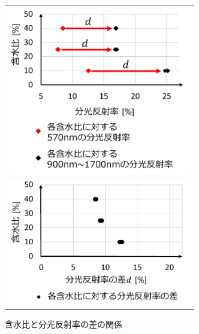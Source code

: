 \begin{figure}[p]
	\begin{center}
		\begin{tabular}{c}

			\begin{minipage}[t]{\linewidth}
			\hspace{1.5cm}\includegraphics[width=8cm]{./Ch4_WaterContentEstimation/Fig/watercontent_and_spectrum_graph_compressed.pdf}
			\caption{含水比と2つの波長帯の分光反射率の関係}\label{fig:watercontent_and_spectrum_graph}
			\vspace{2cm}
			\end{minipage}

			\\

			\begin{minipage}[b]{\linewidth}
			\hspace{1.5cm}\includegraphics[width=8cm]{./Ch4_WaterContentEstimation/Fig/watercontent_and_spectrumDiff_graph_compressed.pdf}
			\caption{含水比と分光反射率の差の関係}\label{fig:watercontent_and_spectrumDiff_graph}
			\end{minipage}

		\end{tabular}
	\end{center}
\end{figure}

